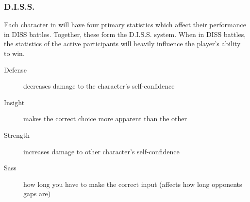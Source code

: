\subsubsection{D.I.S.S.}
Each character in \ourgame{} will have four primary statistics which affect their performance in DISS battles. Together, these form the D.I.S.S. system. When in DISS battles, the statistics of the active participants will heavily influence the player's ability to win.

\begin{description}
\item[Defense]{decreases damage to the character's self-confidence}
\item[Insight]{makes the correct choice more apparent than the other}
\item[Strength]{increases damage to other character's self-confidence}
\item[Sass]{how long you have to make the correct input (affects how long opponents gaps are)}
\end{description}